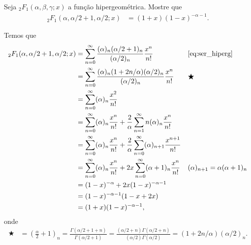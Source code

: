\documentclass[a4paper,12pt, leqno, answers]{exam}
\begin{document}
\begin{questions}
    \question[Exame de 2011] Seja ${}_2F_1(\alpha, \beta, \gamma; x)$ a fun\c{c}\~{a}o hipergeom\'{e}trica. Mostre que
    \begin{align*}
        {}_2F_1(\alpha, \alpha/2 + 1, \alpha/2; x) &= (1 + x)(1 - x)^{-\alpha - 1}.
    \end{align*}
    \begin{solution}
        Temos que
        \begin{align*}
            {}_2F_1(\alpha, \alpha/2 + 1, \alpha/2; x) &= \sum_{n = 0}^\infty \frac{(\alpha)_n (\alpha/2 + 1)_n}{(\alpha/2)_n} \frac{x^n}{n!} && \text{\eqref{eq:ser_hiperg}} \\
            &= \sum_{n = 0}^\infty \frac{(\alpha)_n (1 + 2 n / \alpha)(\alpha/2)_n}{(\alpha/2)_ n} \frac{x^n}{n!} && \bigstar \\
            &= \sum_{n = 0}^\infty (\alpha)_n \frac{x^2}{n!} \\
            &= \sum_{n = 0}^\infty (\alpha)_n \frac{x^n}{n!} + \frac{2}{\alpha} \sum_{n = 1}^\infty n(\alpha)_n \frac{x^n}{n!} \\
            &= \sum_{n = 0}^\infty (\alpha)_n \frac{x^n}{n!} + \frac{2}{\alpha} \sum_{n = 0}^\infty (\alpha)_{n + 1} \frac{x^{n + 1}}{n!} \\
            &= \sum_{n = 0}^\infty (\alpha)_n \frac{x^n}{n!} + 2x \sum_{n = 0}^\infty (\alpha + 1)_n \frac{x^n}{n!} && (\alpha)_{n + 1} = \alpha (\alpha + 1)_n \\
            &= (1 - x)^{-\alpha} + 2 x (1 - x)^{-\alpha - 1} \\
            &= (1 - x)^{- \alpha - 1} (1 - x + 2x) \\
            &=(1 + x)(1 - x)^{-\alpha - 1},
        \end{align*}
        onde
        \begin{align*}
            \bigstar &= \left( \frac{\alpha}{2} + 1 \right)_n = \frac{\Gamma(\alpha/2 + 1 + n)}{\Gamma(\alpha/2 + 1)} = \frac{(\alpha/2 + n) \Gamma(\alpha/2 + n)}{(\alpha/2) \Gamma(\alpha/2)} = (1 + 2n/\alpha) (\alpha/2)_n.
        \end{align*}
    \end{solution}
\end{questions}


\end{document}
